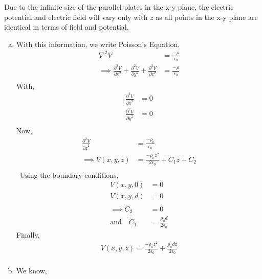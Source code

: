 \begin{problem}{}{}    
    Due to the infinite size of the parallel plates in the x-y plane, the electric potential and electric field will vary only with $z$ as all points in the x-y plane are identical in terms of field and potential. 
    \begin{enumerate}[(a)]
        \item 
            With this information, we write Poisson's Equation,  
            \begin{align*}
                \mathbb{\nabla}^2V &= \frac{-\rho}{\epsilon_0}\\
                \implies \frac{\partial^2 V}{\partial x^2}+\frac{\partial^2 V}{\partial y^2}+\frac{\partial^2 V}{\partial z^2} &= \frac{-\rho}{\epsilon_0}\\
            \end{align*}
            With, 
            \begin{align*}
                \frac{\partial^2 V}{{\partial x}^2} &= 0\\              
                \frac{\partial^2 V}{{\partial y}^2} &= 0\\              
            \end{align*}
            Now, 
            \begin{align*}
                \frac{\partial^2 V}{{\partial z}^2} &= \frac{-\rho_0}{\epsilon_0}\\              
                \implies V(x, y, z) &= \frac{-\rho_0 z^2}{2\epsilon_0} + C_1z + C_2\\
            \end{align*}\
            Using the boundary conditions, 
            \begin{align*}
                V(x, y, 0) &= 0\\
                V(x, y, d) &= 0\\
                \\
                \implies C_2 &= 0\\
                \text{and} \quad C_1 &= \frac{\rho_0 d}{2\epsilon_0} 
            \end{align*}
            Finally, 
            \begin{align*}
                V(x,y,z) = \frac{-\rho_0 z^2}{2\epsilon_0} + \frac{\rho_0 dz}{2\epsilon_0}  \\
            \end{align*}
        \item 
        We know, 
        \begin{align*}

\end{align*}
\end{enumerate}
\end{problem}
